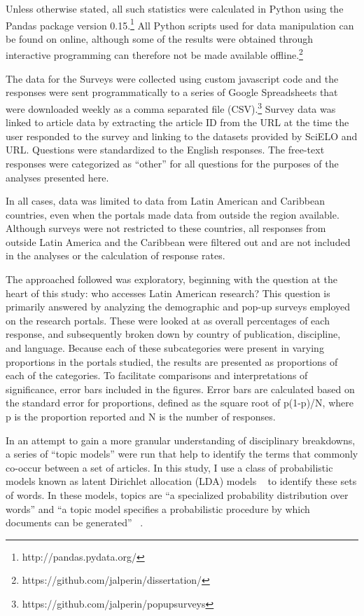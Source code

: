 Unless otherwise stated, all such statistics were calculated in Python using the Pandas package version 0.15.\footnote{http:\slash \slash pandas.pydata.org\slash } All Python scripts used for data manipulation can be found on online, although some of the results were obtained through interactive programming can therefore not be made available offline.\footnote{https:\slash \slash github.com\slash jalperin\slash dissertation\slash }

The data for the Surveys were collected using custom javascript code and the responses were sent programmatically to a series of Google Spreadsheets that were downloaded weekly as a comma separated file (CSV).\footnote{https:\slash \slash github.com\slash jalperin\slash popupsurveys} Survey data was linked to article data by extracting the article ID from the URL at the time the user responded to the survey and linking to the datasets provided by SciELO and URL. Questions were standardized to the English responses. The free-text responses were categorized as ``other'' for all questions for the purposes of the analyses presented here.

In all cases, data was limited to data from Latin American and Caribbean countries, even when the portals made data from outside the region available. Although surveys were not restricted to these countries, all responses from outside Latin America and the Caribbean were filtered out and are not included in the analyses or the calculation of response rates.

The approached followed was exploratory, beginning with the question at the heart of this study: who accesses Latin American research? This question is primarily answered by analyzing the demographic and pop-up surveys employed on the research portals. These were looked at as overall percentages of each response, and subsequently broken down by country of publication, discipline, and language. Because each of these subcategories were present in varying proportions in the portals studied, the results are presented as proportions of each of the categories. To facilitate comparisons and interpretations of significance, error bars included in the figures. Error bars are calculated based on the standard error for proportions, defined as the square root of p(1-p)\slash N, where p is the proportion reported and N is the number of responses.

In an attempt to gain a more granular understanding of disciplinary breakdowns, a series of ``topic models'' were run that help to identify the terms that commonly co-occur between a set of articles. In this study, I use a class of probabilistic models known as latent Dirichlet allocation (LDA) models ~\citep{Blei2003} to identify these sets of words. In these models, topics are ``a specialized probability distribution over words'' and ``a topic model specifies a probabilistic procedure by which documents can be generated'' ~\citep[p. 610]{McFarland2013}.

